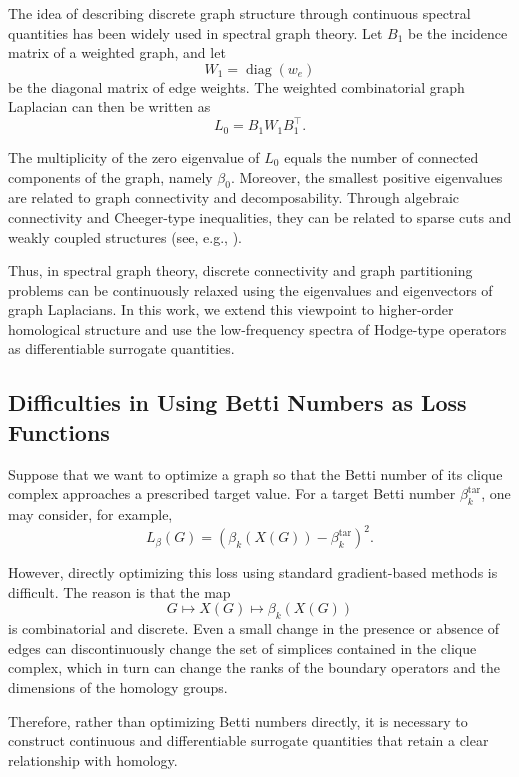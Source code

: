 \documentclass[pdflatex,sn-mathphys-num]{sn-jnl}%
\theoremstyle{thmstyleone}%
\theoremstyle{thmstyletwo}%
\theoremstyle{thmstylethree}%
\begin{document}
The idea of describing discrete graph structure through continuous spectral quantities has been widely used in spectral graph theory\cite{chung1997spectral,vonluxburg2007tutorialspectralclustering,lee2014multiwayspectralpartitioninghigherorder}.
Let \(B_1\) be the incidence matrix of a weighted graph, and let
\[
W_1=\operatorname{diag}(w_e)
\]
be the diagonal matrix of edge weights.
The weighted combinatorial graph Laplacian can then be written as
\[
L_0=B_1W_1B_1^{\top}.
\]

The multiplicity of the zero eigenvalue of \(L_0\) equals the number of connected components of the graph, namely \(\beta_0\).
Moreover, the smallest positive eigenvalues are related to graph connectivity and decomposability.
Through algebraic connectivity and Cheeger-type inequalities, they can be related to sparse cuts and weakly coupled structures
(see, e.g., \cite{chung1997spectral,vonluxburg2007tutorialspectralclustering,lee2014multiwayspectralpartitioninghigherorder}).

Thus, in spectral graph theory, discrete connectivity and graph partitioning problems can be continuously relaxed using the eigenvalues and eigenvectors of graph Laplacians.
In this work, we extend this viewpoint to higher-order homological structure and use the low-frequency spectra of Hodge-type operators as differentiable surrogate quantities.




\subsection{Difficulties in Using Betti Numbers as Loss Functions}

Suppose that we want to optimize a graph so that the Betti number of its clique complex approaches a prescribed target value.
For a target Betti number \(\beta_k^{\mathrm{tar}}\), one may consider, for example,
\[
L_{\beta}(G)
=
\left(
\beta_k(X(G))-\beta_k^{\mathrm{tar}}
\right)^2.
\]

However, directly optimizing this loss using standard gradient-based methods is difficult.
The reason is that the map
\[
G
\longmapsto
X(G)
\longmapsto
\beta_k(X(G))
\]
is combinatorial and discrete.
Even a small change in the presence or absence of edges can discontinuously change the set of simplices contained in the clique complex, which in turn can change the ranks of the boundary operators and the dimensions of the homology groups.

Therefore, rather than optimizing Betti numbers directly, it is necessary to construct continuous and differentiable surrogate quantities that retain a clear relationship with homology.
\end{document}
